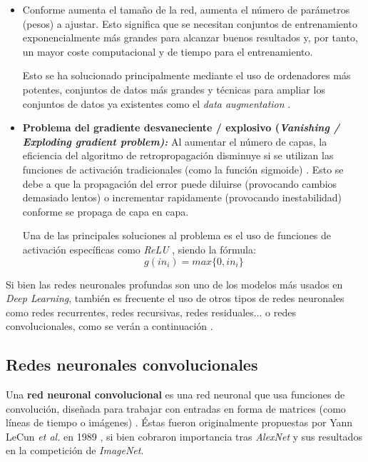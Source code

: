 \begin{itemize}
	\item Conforme aumenta el tamaño de la red, aumenta el número de parámetros (pesos) a ajustar. Esto significa que se necesitan conjuntos de entrenamiento exponencialmente más grandes para alcanzar buenos resultados y, por tanto, un mayor coste computacional y de tiempo para el entrenamiento.
	
	Esto se ha solucionado principalmente mediante el uso de ordenadores más potentes, conjuntos de datos más grandes y técnicas para ampliar los conjuntos de datos ya existentes como el \textit{data augmentation} \cite{Shorten2019ASO}. 
	
	\item \textbf{Problema del gradiente desvaneciente / explosivo (\textit{Vanishing / Exploding gradient problem):}} Al aumentar el número de capas, la eficiencia del algoritmo de retropropagación disminuye si se utilizan las funciones de activación tradicionales (como la función sigmoide) \cite{gradientKolen}. Esto se debe a que la propagación del error puede diluirse (provocando cambios demasiado lentos) o incrementar rapidamente (provocando inestabilidad) conforme se propaga de capa en capa.
	
	Una de las principales soluciones al problema es el uso de funciones de activación específicas como \textit{ReLU} \cite{Goodfellow-et-al-2016}, siendo la fórmula:
	\[g(in_i)=max\{0,in_i\}\]
\end{itemize}

Si bien las redes neuronales profundas son uno de los modelos más usados en \textit{Deep Learning}, también es frecuente el uso de otros tipos de redes neuronales como redes recurrentes, redes recursivas, redes residuales... o redes convolucionales, como se verán a continuación \cite{Goodfellow-et-al-2016}.

\subsection{Redes neuronales convolucionales}

Una \textbf{red neuronal convolucional} es una red neuronal que usa funciones de convolución, diseñada para trabajar con entradas en forma de matrices (como líneas de tiempo o imágenes) \cite{Goodfellow-et-al-2016}. Éstas fueron originalmente propuestas por Yann LeCun \textit{et al.} en 1989 \cite{10.1162/neco.1989.1.4.541}, si bien cobraron importancia tras \textit{AlexNet} \cite{Krizhevsky2012ImageNetCW} y sus resultados en la competición de \textit{ImageNet}.

